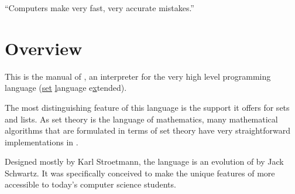 


\globalDate{\today}







\begin{titlepage}
\maketitle

\vfill

\begin{center}
\Large
``Computers make very fast, very accurate mistakes.''
\end{center}

\vfill
\tableofcontents
\end{titlepage}

\section{Overview}

This is the manual of \setlX, an interpreter for the very high level programming language \SetlX{} (\underline{set} \underline{l}anguage e\underline{x}tended).

The most distinguishing feature of this language is the support it offers for sets and lists.
As set theory is the language of mathematics, many mathematical algorithms that are formulated in terms of set theory have very straightforward implementations in \SetlX{}.

Designed mostly by Karl Stroetmann, the \SetlX{} language is an evolution of \Setl{} by Jack Schwartz.
It was specifically conceived to make the unique features of \Setl{} more accessible to today's computer science students.

